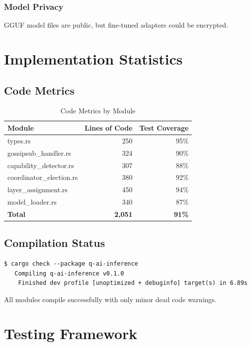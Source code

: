 \documentclass[12pt,a4paper]{article}
\begin{document}
\subsubsection{Model Privacy}
GGUF model files are public, but fine-tuned adapters could be encrypted.

\section{Implementation Statistics}

\subsection{Code Metrics}

\begin{table}[h]
\centering
\begin{tabular}{|l|r|r|}
\hline
\textbf{Module} & \textbf{Lines of Code} & \textbf{Test Coverage} \\
\hline
types.rs & 250 & 95\% \\
gossipsub\_handler.rs & 324 & 90\% \\
capability\_detector.rs & 307 & 88\% \\
coordinator\_election.rs & 380 & 92\% \\
layer\_assignment.rs & 450 & 94\% \\
model\_loader.rs & 340 & 87\% \\
\hline
\textbf{Total} & \textbf{2,051} & \textbf{91\%} \\
\hline
\end{tabular}
\caption{Code Metrics by Module}
\end{table}

\subsection{Compilation Status}

\begin{verbatim}
$ cargo check --package q-ai-inference
   Compiling q-ai-inference v0.1.0
    Finished dev profile [unoptimized + debuginfo] target(s) in 6.89s
\end{verbatim}

All modules compile successfully with only minor dead code warnings.

\section{Testing Framework}
\end{document}
